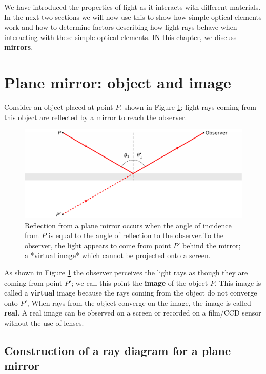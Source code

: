 \documentclass[
]{book}
\begin{document}
We have introduced the properties of light as it interacts with different materials. In the next two sections we will now use this to show how simple optical elements work and how to determine factors describing how light rays behave when interacting with these simple optical elements. IN this chapter, we discuss \textbf{mirrors}.

\hypertarget{sec-ch15-planemirror1}{%
\section{Plane mirror: object and image}\label{sec-ch15-planemirror1}}

Consider an object placed at point \(P\), shown in Figure \ref{fig:ch15-planemirror1}; light rays coming from this object are reflected by a mirror to reach the observer.

\begin{figure}

{\centering \includegraphics[width=0.7\linewidth]{visualisations/LaTeX/ch15-planemirror1} 

}

\caption{Reflection from a plane mirror occurs when the angle of incidence from $P$ is equal to the angle of reflection to the observer.To the observer, the light appears to come from point $P'$ behind the mirror; a *virtual image* which cannot be projected onto a screen.}\label{fig:ch15-planemirror1}
\end{figure}

As shown in Figure \ref{fig:ch15-planemirror1} the observer perceives the light rays as though they are coming from point \(P'\); we call this point the \textbf{image} of the object \(P\). This image is called a \textbf{virtual} image because the rays coming from the object do not converge onto \(P'\), When rays from the object converge on the image, the image is called \textbf{real}. A real image can be observed on a screen or recorded on a film/CCD sensor without the use of lenses.

\hypertarget{sec-ch15-planemirror2}{%
\subsection{Construction of a ray diagram for a plane mirror}\label{sec-ch15-planemirror2}}
\end{document}
